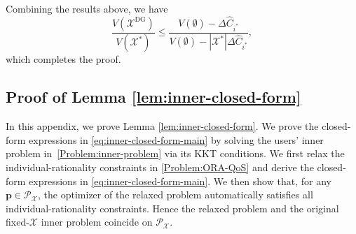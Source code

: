 \documentclass[lettersize,journal]{IEEEtran}
\begin{document}
Combining the results above, we have
\[
\frac{V(\mathcal{X}^{\mathrm{DG}})}{V(\mathcal{X}^*)}
\le
\frac{V(\emptyset) - \Delta \hat{C}_{i^*}}{V(\emptyset) - |\mathcal{X}^*| \Delta \hat{C}_{i^*}},
\]
which completes the proof.

\subsection{Proof of Lemma \ref{lem:inner-closed-form}}\label{proof:inner-closed-form}

In this appendix, we prove Lemma \ref{lem:inner-closed-form}.
We prove the closed-form expressions in \eqref{eq:inner-closed-form-main} by solving the users' inner problem in~\eqref{Problem:inner-problem} via its KKT conditions. 
We first relax the individual-rationality constraints in \eqref{Problem:ORA-QoS} and derive the closed-form expressions in \eqref{eq:inner-closed-form-main}. We then show that, for any $\boldsymbol{p}\in\mathcal P_{\mathcal X}$, the optimizer of the relaxed problem automatically satisfies all individual-rationality constraints. Hence the relaxed problem and the original fixed-$\mathcal X$ inner problem coincide on $\mathcal P_{\mathcal X}$.
\end{document}
